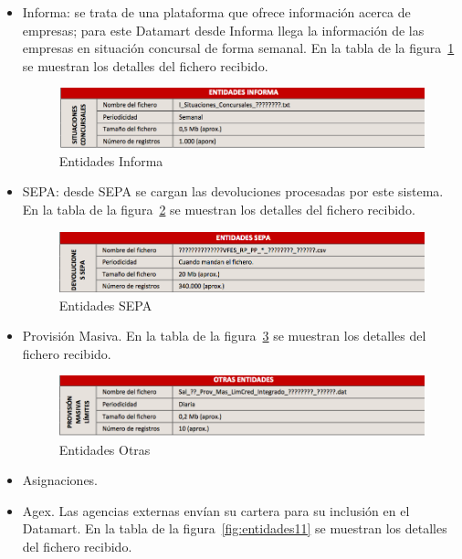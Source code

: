 \documentclass[a4paper, 12pt]{book}
\begin{document}
\begin{itemize}
	\item Informa: se trata de una plataforma que ofrece información acerca de empresas; para este Datamart desde Informa llega la información de las empresas en situación concursal de forma semanal. En la tabla de la figura~\ref{fig:entidades8} se muestran los detalles del fichero recibido.

	\begin{figure}
	  \centering
	  \includegraphics[width=14cm, keepaspectratio]{img/entidades8}
	  \caption{Entidades Informa}
	  \label{fig:entidades8}
	\end{figure}
	
	\item SEPA: desde SEPA se cargan las devoluciones procesadas por este sistema. En la tabla de la figura~\ref{fig:entidades9} se muestran los detalles del fichero recibido.

	\begin{figure}
	  \centering
	  \includegraphics[width=14cm, keepaspectratio]{img/entidades9}
	  \caption{Entidades SEPA}
	  \label{fig:entidades9}
	\end{figure}
	
	\item Provisión Masiva. En la tabla de la figura~\ref{fig:entidades10} se muestran los detalles del fichero recibido.

	\begin{figure}
	  \centering
	  \includegraphics[width=14cm, keepaspectratio]{img/entidades10}
	  \caption{Entidades Otras}
	  \label{fig:entidades10}
	\end{figure}
	
	\item Asignaciones.
	
	\item Agex. Las agencias externas envían su cartera para su inclusión en el Datamart. En la tabla de la figura~\ref{fig:entidades11} se muestran los detalles del fichero recibido.


\end{itemize}
\end{document}
